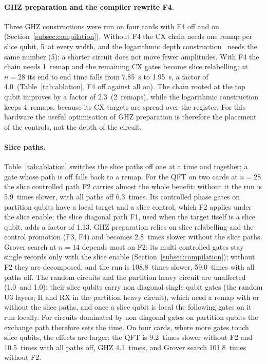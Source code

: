 \documentclass[pdflatex,sn-mathphys-num]{sn-jnl}
\newcommand{\NumAblGhzFourAllOff}{4.1}
\newcommand{\NumAblGhzTwoAllOff}{2.8}
\newcommand{\NumAblGroverFourFtwoOff}{101.8}
\newcommand{\NumAblGroverTwoAllOff}{59.0}
\newcommand{\NumAblGroverTwoFtwoOff}{108.8}
\newcommand{\NumAblGroverTwoN}{14}
\newcommand{\NumAblPhTwoAllOff}{1.0}
\newcommand{\NumAblQftFourAllOff}{10.5}
\newcommand{\NumAblQftFourFtwoOff}{9.2}
\newcommand{\NumAblQftTwoAllOff}{6.3}
\newcommand{\NumAblQftTwoFoneOff}{1.13}
\newcommand{\NumAblQftTwoFtwoOff}{5.9}
\newcommand{\NumAblRandTwoAllOff}{1.0}
\newcommand{\NumGhzChainRemapsFfourAll}{1}
\newcommand{\NumGhzChainRemapsNoFfour}{5}
\newcommand{\NumGhzChainSpeedupFfour}{4.0}
\newcommand{\NumGhzChainTimeFfour}{1.95}
\newcommand{\NumGhzChainTimeNoFfour}{7.85}
\newcommand{\NumGhzLogRemapsFfourAll}{4}
\newcommand{\NumGhzLogRemapsNoFfour}{5}
\newcommand{\NumGhzTopRemapsFfourAll}{2}
\newcommand{\NumGhzTopSpeedupFfour}{2.3}
\theoremstyle{thmstyleone}
\theoremstyle{thmstylethree}
\begin{document}
\paragraph{GHZ preparation and the compiler rewrite F4.} Three GHZ constructions were run on four cards with F4 off
and on (Section~\ref{subsec:compilation}). Without F4 the CX chain needs one remap per slice qubit,
\NumGhzChainRemapsNoFfour~at every width, and the logarithmic depth construction~\cite{cruz2019efficient} needs the same
number (\NumGhzLogRemapsNoFfour): a shorter circuit does not move fewer amplitudes. With F4 the chain needs
\NumGhzChainRemapsFfourAll~remap and the remaining CX gates become slice relabelling; at $n=28$ its end to end time falls
from \NumGhzChainTimeNoFfour~s to \NumGhzChainTimeFfour~s, a factor of \NumGhzChainSpeedupFfour~(Table~\ref{tab:ablation},
F4 off against all on). The chain rooted at the
top qubit improves by a factor of \NumGhzTopSpeedupFfour~(\NumGhzTopRemapsFfourAll~remaps), while the logarithmic
construction keeps \NumGhzLogRemapsFfourAll~remaps, because its CX targets are spread over the register. For this
hardware the useful optimisation of GHZ preparation is therefore the placement of the controls, not the depth of the
circuit.

\paragraph{Slice paths.} Table~\ref{tab:ablation} switches the slice paths off one at a time and together; a gate
whose path is off falls back to a remap. For the QFT on two cards at $n=28$ the slice controlled path F2 carries almost
the whole benefit: without it the run is \NumAblQftTwoFtwoOff~times slower, with all paths off \NumAblQftTwoAllOff~times.
Its controlled phase gates on partition qubits have a local target and a slice control, which F2 applies under the slice
enable; the slice diagonal path F1, used when the target itself is a slice qubit, adds a factor of \NumAblQftTwoFoneOff.
GHZ preparation relies on slice relabelling and the control promotion (F3, F4) and becomes \NumAblGhzTwoAllOff~times
slower without the slice paths. Grover search at $n=\NumAblGroverTwoN$ depends most on F2: its multi controlled
gates stay single records only with the slice enable (Section~\ref{subsec:compilation}); without F2 they are decomposed,
and the run is \NumAblGroverTwoFtwoOff~times slower, \NumAblGroverTwoAllOff~times with all paths off. The random circuits and the partition heavy circuit are unaffected
(\NumAblRandTwoAllOff~and \NumAblPhTwoAllOff): their slice qubits carry non diagonal single qubit gates (the random
U3 layers; H and RX in the partition heavy circuit), which need a remap with or without the slice paths, and once a slice
qubit is local the following gates on it run locally. For circuits dominated by non diagonal gates on partition
qubits the exchange path therefore sets the time. On four cards, where more gates touch slice qubits, the effects are larger: the QFT is
\NumAblQftFourFtwoOff~times slower without F2 and \NumAblQftFourAllOff~times with all paths off, GHZ
\NumAblGhzFourAllOff~times, and Grover search \NumAblGroverFourFtwoOff~times without F2.
\end{document}
